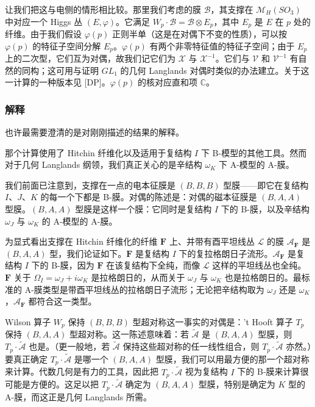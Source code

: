 让我们把这与电侧的情形相比较。那里我们考虑的膜 $\mathcal{B}$，其支撑在 $\mathcal{M}_H(SO_3)$ 中对应一个 Higgs 丛 $(E,\varphi)$。它满足
$W_p\cdot\mathcal{B}=\mathcal{B}\otimes E_p$，其中 $E_p$ 是 $E$ 在 $p$ 处的纤维。由于我们假设 $\varphi(p)$ 正则半单（这是在对偶下不变的性质），可以按 $\varphi(p)$ 的特征子空间分解 $E_p$。$\varphi(p)$ 有两个非零特征值的特征子空间；由于 $E_p$ 上的二次型，它们互为对偶，故我们记它们为 $\mathcal{X}$ 与 $\mathcal{X}^{-1}$。它们与 $\mathcal{V}$ 和 $\mathcal{V}^{-1}$ 有自然的同构；这可用与证明 $GL_1$ 的几何 Langlands 对偶时类似的办法建立。关于这一计算的一种版本见 [DP]。$\varphi(p)$ 的核对应直和项 $\mathbb{C}$。

\subsubsection{解释}

也许最需要澄清的是对刚刚描述的结果的解释。

那个计算使用了 Hitchin 纤维化以及适用于复结构 $I$ 下 B-模型的其他工具。然而对于几何 Langlands 纲领，我们真正关心的是辛结构 $\omega_K$ 下 A-模型的 A-膜。

我们前面已注意到，支撑在一点的电本征膜是 $(B,B,B)$ 型膜——即它在复结构 $I$、$J$、$K$ 的每一个下都是 B-膜。对偶的陈述是：对偶的磁本征膜是 $(B,A,A)$ 型膜。$(B,A,A)$ 型膜是这样一个膜：它同时是复结构 $I$ 下的 B-膜，以及辛结构 $\omega_J$ 与 $\omega_K$ 的 A-模型的 A-膜。

为显式看出支撑在 Hitchin 纤维化的纤维 $\boldsymbol{F}$ 上、并带有酉平坦线丛 $\mathcal{L}$ 的膜 $\mathcal{A}_{\boldsymbol{F}}$ 是 $(B,A,A)$ 型，我们论证如下。$\boldsymbol{F}$ 是复结构 $I$ 下的复拉格朗日子流形。$\mathcal{A}_{\boldsymbol{F}}$ 是复结构 $I$ 下的 B-膜，因为 $\boldsymbol{F}$ 在该复结构下全纯，而像 $\mathcal{L}$ 这样的平坦线丛也全纯。$\boldsymbol{F}$ 关于 $\Omega_I=\omega_J+i\omega_K$ 是拉格朗日的，从而关于 $\omega_J$ 与 $\omega_K$ 也是拉格朗日的。最标准的 A-膜类型是带酉平坦线丛的拉格朗日子流形；无论把辛结构取为 $\omega_J$ 还是 $\omega_K$，$\mathcal{A}_{\boldsymbol{F}}$ 都符合这一类型。

Wilson 算子 $W_p$ 保持 $(B,B,B)$ 型超对称这一事实的对偶是：'t Hooft 算子 $T_p$ 保持 $(B,A,A)$ 型超对称。这一陈述意味着：若 $\widetilde{\mathcal{A}}$ 是 $(B,A,A)$ 型膜，则 $T_p\cdot\widetilde{\mathcal{A}}$ 也是。（更一般地，若 $\widetilde{\mathcal{A}}$ 保持这些超对称的任一线性组合，则 $T_p\cdot\widetilde{\mathcal{A}}$ 亦然。）要真正确定 $T_p\cdot\widetilde{\mathcal{A}}$ 是哪一个 $(B,A,A)$ 型膜，我们可以用最方便的那一个超对称来计算。代数几何是有力的工具，因此把 $T_p\cdot\widetilde{\mathcal{A}}$ 视为复结构 $I$ 下的 B-膜来计算很可能是方便的。这足以把 $T_p\cdot\widetilde{\mathcal{A}}$ 确定为 $(B,A,A)$ 型膜，特别是确定为 $K$ 型的 A-膜，而这正是几何 Langlands 所需。

